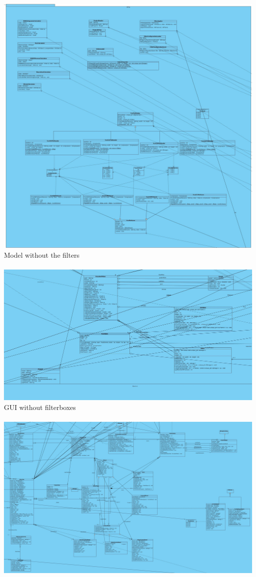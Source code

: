 \documentclass[twoside]{book}
\newcommand{\+}{\discretionary{\mbox{\scriptsize$\hookleftarrow$}}{}{}}
\begin{document}
{\centering\includegraphics[width=1\textwidth]{Utility.jpg}}\\
\newpage
Model without the filters\\\\
{\centering\includegraphics[width=1\textwidth]{Model_noFilter.jpg}}\\
\newpage
GUI without filterboxes\\\\
{\centering\includegraphics[width=1\textwidth]{GUI_noFilter.jpg}}\\
\end{document}
